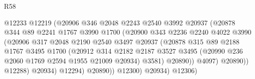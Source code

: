 \begin{lexlean}{R58}
\begin{coremodule}
                                    @12233
                                    @12219
                                    (@20906
                                      @346
                                      @2048
                                      @2243
                                      @2540
                                      @3992
                                      @20937
                                      (@20878
                                        @344
                                        @89
                                        @2241
                                        @1767
                                        @3990
                                        @1700
                                        (@20900
                                          @343
                                          @2236
                                          @2240
                                          @4022
                                          @3990
                                          (@20906
                                            @317
                                            @2048
                                            @2190
                                            @2540
                                            @3497
                                            @20937
                                            (@20878
                                              @315
                                              @89
                                              @2188
                                              @1767
                                              @3495
                                              @1700
                                              (@20912
                                                @314
                                                @2182
                                                @2187
                                                @3527
                                                @3495
                                                (@20990 @236 @2060 @1769 @2594 @1955 @21009 @20934)
                                                @3581)
                                              @20890))
                                          @4097)
                                        @20890))
                                    @12288)
                                  @20934)
                                @12294)
                              @20890))
                          @12300)
                        @20934)
                      @12306)

\end{coremodule}
\end{lexlean}
